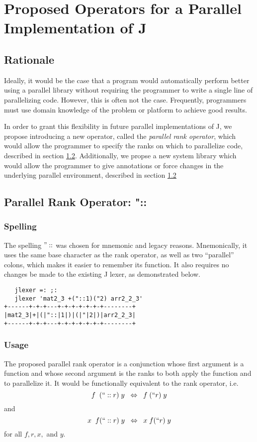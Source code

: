 \chapter{Proposed Operators for a Parallel Implementation of J} %
\label{paraop}

\section{Rationale}
Ideally, it would be the case that a program would automatically perform better using a parallel library 
without requiring the programmer to write a single line of parallelizing code. 
However, this is often not the case. %
Frequently, programmers must use domain knowledge of the problem or platform to achieve good results. 

In order to grant this flexibility in future parallel implementations of J, 
we propose introducing a new operator, called the \textit{parallel rank operator}, 
which would allow the programmer to specify the ranks on which to parallelize code, 
described in section \ref{prank}.
Additionally, we propse a new system library
which would allow the programmer to give annotations or force changes in the underlying parallel environment,
described in section \ref{prank}

\section{Parallel Rank Operator: "::}
\label{prank}

\subsection{Spelling}
The spelling $"::$ was chosen for mnemonic and legacy reasons. 
Mnemonically, it uses the same base character as the rank operator, 
as well as two ``parallel'' colons, which makes it easier to remember its function.
It also requires no changes be made to the existing J lexer\cite{ioj}, 
as demonstrated below.

\begin{verbatim}
   jlexer =: ;:
   jlexer 'mat2_3 +("::1)("2) arr2_2_3'
+------+-+-+---+-+-+-+-+-+-+--------+
|mat2_3|+|(|"::|1|)|(|"|2|)|arr2_2_3|
+------+-+-+---+-+-+-+-+-+-+--------+
\end{verbatim}

\subsection{Usage}
The proposed parallel rank operator is a conjunction 
whose first argument is a function 
and whose second argument is the ranks to both apply the function and to parallelize it. 
It would be functionally equivalent to the rank operator, i.e. 
\[f\;\;(``::r)\;y\;\;\Leftrightarrow\;\;f\;(``r)\;y\] and \[x\;\;f(``::r)\;y\;\;\Leftrightarrow\;\;x\;f(``r)\;y\] for all $f, r, x,$ and $y$.

